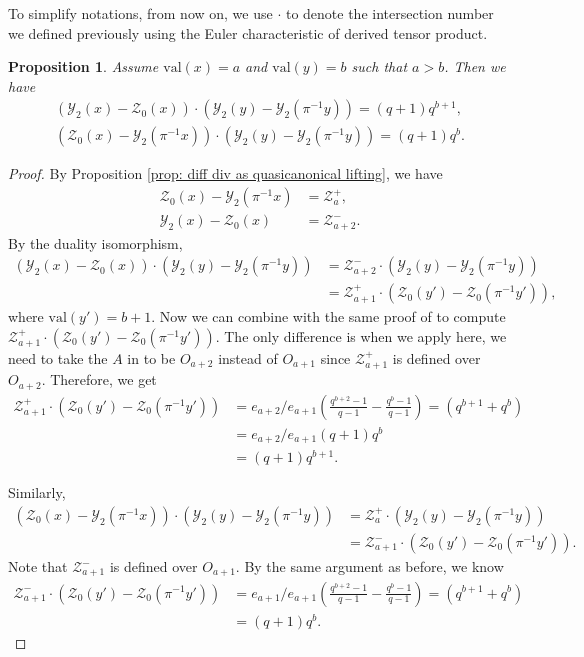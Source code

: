 \documentclass[11pt,oneside]{amsart}
\newcommand{\val}{{\mathrm{val}}}
\theoremstyle{plain}
\newtheorem{proposition}[theorem]{Proposition}
\theoremstyle{definition}
\theoremstyle{remark}
\newcommand{\cZ}{\mathcal{Z}}
\newcommand{\cY}{\mathcal{Y}}
\numberwithin{equation}{section}
\begin{document}
To simplify notations, from now on, we use $\cdot $ to denote the intersection number we defined previously using the Euler characteristic of derived tensor product.
\begin{proposition}\label{prop: div intersection}
	Assume $\val(x)=a$ and $\val(y)=b$ such that  $a>b$. Then we have
	\begin{align*}
	 (\cY_2(x)-\cZ_0(x))\cdot  (\cY_2(y)-\cY_2(\pi^{-1}y))=(q+1)q^{b+1},\\
	 (\cZ_0(x)-\cY_2(\pi^{-1}x))\cdot  (\cY_2(y)-\cY_2(\pi^{-1}y))=(q+1)q^{b}.
	\end{align*}
\end{proposition}
\begin{proof}
	By Proposition \ref{prop: diff div as quasicanonical lifting}, we have 
   \begin{align*}
	 \cZ_0(x) -\cY_2(\pi^{-1}x)&=\cZ_a^+ ,\\
	 \cY_2(x)-\cZ_0(x)&=\cZ_{a+2}^-.
	\end{align*}
By the duality isomorphism, 
\begin{align*}
     (\cY_2(x)-\cZ_0(x))\cdot  (\cY_2(y)-\cY_2(\pi^{-1}y))
     &= \cZ_{a+2}^- \cdot  (\cY_2(y)-\cY_2(\pi^{-1}y))\\
     &= \cZ_{a+1}^+ \cdot  (\cZ_0(y')-\cZ_0(\pi^{-1}y')),
\end{align*}
where $\val(y')=b+1$. 
Now we can combine \cite[Theorem 7.1]{KR1} with the same proof of \cite[Proposition 8.4]{KR1} to compute $\cZ_{a+1}^+ \cdot  (\cZ_0(y')-\cZ_0(\pi^{-1}y'))$. The only difference is when we apply  \cite[Theorem 7.1]{KR1} here, we need to take the $A$ in  \cite[Theorem 7.1]{KR1} to be $O_{a+2}$ instead of $O_{a+1}$ since $\cZ_{a+1}^+$ is defined over $O_{a+2}$. Therefore, we get
    \begin{align*}
        \cZ_{a+1}^+ \cdot  (\cZ_0(y')-\cZ_0(\pi^{-1}y'))&= 
e_{a+2}/e_{a+1}(\frac{q^{b+2}-1}{q-1}-\frac{q^{b}-1}{q-1})=(q^{b+1}+q^b)\\
&=e_{a+2}/e_{a+1}(q+1)q^b\\&=(q+1)q^{b+1}.
    \end{align*}
 


Similarly,   
\begin{align*}
     (\cZ_0(x)-\cY_2(\pi^{-1}x))\cdot  (\cY_2(y)-\cY_2(\pi^{-1}y))&=\cZ_a^+\cdot (\cY_2(y)-\cY_2(\pi^{-1}y))\\
     &= \cZ_{a+1}^-\cdot (\cZ_0(y')-\cZ_0(\pi^{-1}y')).
\end{align*}
Note that $\cZ_{a+1}^-$ is defined over $O_{a+1}$. By the same argument as before, we know 
    \begin{align*}
        \cZ_{a+1}^- \cdot  (\cZ_0(y')-\cZ_0(\pi^{-1}y'
        ))&= 
e_{a+1}/e_{a+1}(\frac{q^{b+2}-1}{q-1}-\frac{q^{b}-1}{q-1})=(q^{b+1}+q^b)\\
 &=(q+1)q^{b}.
    \end{align*}
\end{proof}



	

	
	
\end{document}
